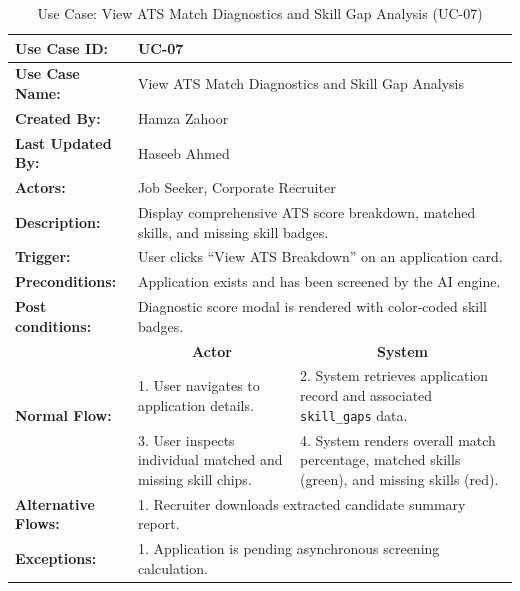 \begin{table}[H]
\centering
\small
\caption{Use Case: View ATS Match Diagnostics and Skill Gap Analysis (UC-07)}
\label{tab:uc07_spec}
\begin{tabular}{|p{3.2cm}|p{5.5cm}|p{5.5cm}|}
\hline
\textbf{Use Case ID:} & \multicolumn{2}{p{11.4cm}|}{UC-07} \\ \hline
\textbf{Use Case Name:} & \multicolumn{2}{p{11.4cm}|}{View ATS Match Diagnostics and Skill Gap Analysis} \\ \hline
\textbf{Created By:} & \multicolumn{2}{p{11.4cm}|}{Hamza Zahoor} \\ \hline
\textbf{Last Updated By:} & \multicolumn{2}{p{11.4cm}|}{Haseeb Ahmed} \\ \hline
\textbf{Actors:} & \multicolumn{2}{p{11.4cm}|}{Job Seeker, Corporate Recruiter} \\ \hline
\textbf{Description:} & \multicolumn{2}{p{11.4cm}|}{Display comprehensive ATS score breakdown, matched skills, and missing skill badges.} \\ \hline
\textbf{Trigger:} & \multicolumn{2}{p{11.4cm}|}{User clicks ``View ATS Breakdown'' on an application card.} \\ \hline
\textbf{Preconditions:} & \multicolumn{2}{p{11.4cm}|}{Application exists and has been screened by the AI engine.} \\ \hline
\textbf{Post conditions:} & \multicolumn{2}{p{11.4cm}|}{Diagnostic score modal is rendered with color-coded skill badges.} \\ \hline
\multirow{3}{*}{\textbf{Normal Flow:}} & \multicolumn{1}{c|}{\textbf{Actor}} & \multicolumn{1}{c|}{\textbf{System}} \\ \cline{2-3}
& 1. User navigates to application details. & 2. System retrieves application record and associated \texttt{skill\_gaps} data. \vspace{2pt} \\
& 3. User inspects individual matched and missing skill chips. & 4. System renders overall match percentage, matched skills (green), and missing skills (red). \\ \hline
\textbf{Alternative Flows:} & \multicolumn{2}{p{11.4cm}|}{1. Recruiter downloads extracted candidate summary report.} \\ \hline
\textbf{Exceptions:} & \multicolumn{2}{p{11.4cm}|}{1. Application is pending asynchronous screening calculation.} \\ \hline
\end{tabular}
\end{table}


